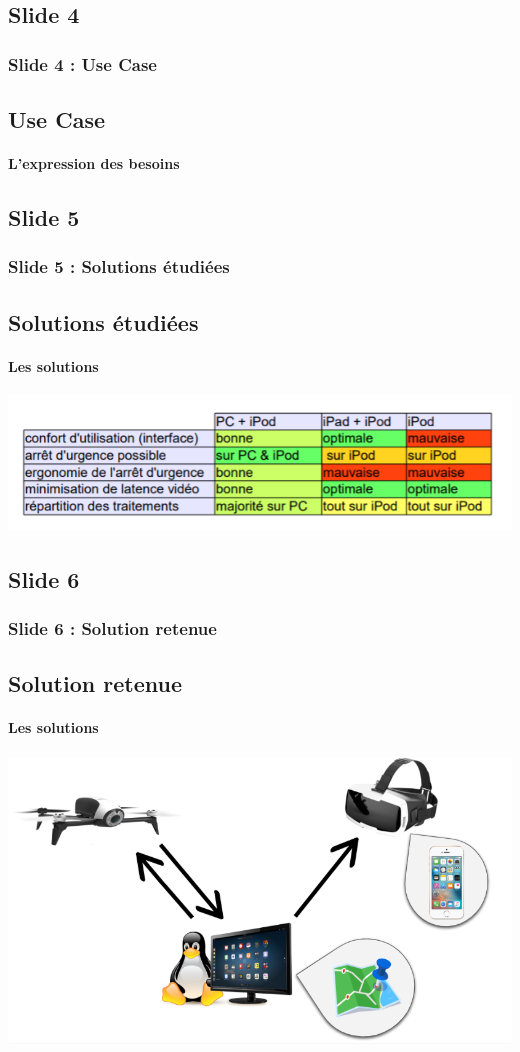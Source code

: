 \documentclass{beamer}
\begin{document}
	\begin{frame}
	\section{Slide 4}
		\begin{center}
		\frametitle{Slide 4 : Use Case}
		\subsection{Use Case}
        \framesubtitle{L'expression des besoins}
       \end{center}
	\end{frame}
	
	\begin{frame}
	\section{Slide 5}
		\begin{center}
		\frametitle{Slide 5 : Solutions étudiées}
		\subsection{Solutions étudiées}
        \framesubtitle{Les solutions}
            \includegraphics[scale=0.9]{comparatif.PNG}
		\end{center}
	\end{frame}
	
		
	\begin{frame}
	\section{Slide 6}
		\begin{center}
		\frametitle{Slide 6 : Solution retenue}
		\subsection{Solution retenue}
        \framesubtitle{Les solutions}
            \includegraphics[scale=0.65]{shcema_archi.png}
		\end{center}
	\end{frame}
	
\end{document}
